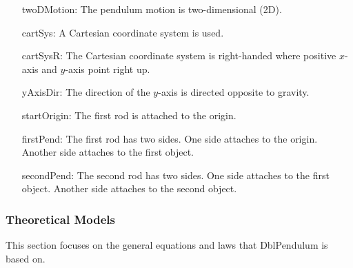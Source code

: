 \documentclass[12pt]{article}
\begin{document}
\begin{itemize}
\item[twoDMotion:\phantomsection\label{twoDMotion}]{The pendulum motion is two-dimensional (2D).}
\item[cartSys:\phantomsection\label{cartSys}]{A Cartesian coordinate system is used.}
\item[cartSysR:\phantomsection\label{cartSysR}]{The Cartesian coordinate system is right-handed where positive $x$-axis and $y$-axis point right up.}
\item[yAxisDir:\phantomsection\label{yAxisDir}]{The direction of the $y$-axis is directed opposite to gravity.}
\item[startOrigin:\phantomsection\label{startOrigin}]{The first rod is attached to the origin.}
\item[firstPend:\phantomsection\label{firstPend}]{The first rod has two sides. One side attaches to the origin. Another side attaches to the first object.}
\item[secondPend:\phantomsection\label{secondPend}]{The second rod has two sides. One side attaches to the first object. Another side attaches to the second object.}
\end{itemize}
\subsubsection{Theoretical Models}
\label{Sec:TMs}
This section focuses on the general equations and laws that DblPendulum is based on.
\end{document}
